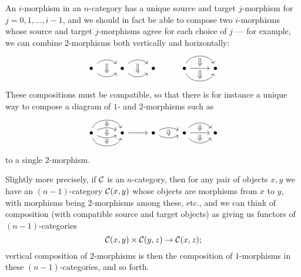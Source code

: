 \documentclass[a4paper,11pt]{article}
\begin{document}
An $i$-morphism in an $n$-category has a unique source and target
$j$-morphism for $j = 0,1,\dots,i-1$, and we should in fact be able to
compose two $i$-morphisms whose source and target $j$-morphisms agree
for each choice of $j$ --- for example, we can combine $2$-morphisms both
vertically and horizontally:
  \[
    \begin{tikzcd}
      \bullet \ar[r, bend left=40, ""{below,name=A,inner sep=2pt}]
      \ar[r, bend right=40, ""{above,name=B,inner sep=2pt}] & \bullet
      \ar[r, bend left=40, ""{below,name=C,inner sep=2pt}]
      \ar[r, bend right=40, ""{above,name=D,inner sep=2pt}] & \bullet
      \ar[from=A, to=B, Rightarrow]
      \ar[from=C, to=D, Rightarrow]
      &  \bullet \ar[r, bend left=70, ""{below,name=E,inner sep=1pt}]
      \arrow[r, ""{above,name=F,inner sep=1pt}, ""{below,name=G,inner
        sep=1pt}]
      \ar[r, bend right=70, ""{above,name=H,inner sep=1pt}]
      & \bullet
      \ar[from=E, to=F, Rightarrow]
      \ar[from=G, to=H, Rightarrow]      
    \end{tikzcd}
  \]
These compositions must be compatible, so that there is for instance a
unique way to compose a diagram of $1$- and $2$-morphisms such as
\[
\begin{tikzcd}
  \bullet 
  \ar[r, bend left=75, ""{below,name=A,inner sep=0.5pt}] 
  \ar[r, bend left=25, ""{name=B1,inner sep=0.5pt},
  ""{name=B2,below,inner sep=1pt}] 
  \ar[r, bend right=25, ""{name=C1,inner sep=1pt}, ""{below,name=C2,inner sep=0.5pt}] 
  \ar[r, bend right=75, ""{name=D,inner sep=1pt}] &
  \bullet 
  \ar[r]  &
  \bullet 
  \ar[r, bend left=25, ""{below,name=E,inner sep=1pt}] 
  \ar[r, bend right=25, ""{name=F,inner sep=1pt}] &
  \bullet 
  \ar[r, bend left=50, ""{below,name=G,inner sep=1pt}] 
  \ar[r, ""{name=H1,inner sep=1pt}, ""{name=H2,below,inner sep=1pt}] 
  \ar[r, bend right=50, ""{name=I,inner sep=1pt}] &
  \bullet
  \arrow[from=A,to=B1,Rightarrow]
  \arrow[from=B2,to=C1,Rightarrow]
  \arrow[from=C2,to=D,Rightarrow]
  \arrow[from=E,to=F,Rightarrow]
  \arrow[from=G,to=H1,Rightarrow]
  \arrow[from=H2,to=I,Rightarrow]
\end{tikzcd}
\]  
to a single $2$-morphism.

Slightly more precisely, if $\mathcal{C}$ is an $n$-category, then for any pair of objects $x,y$ we
have an $(n-1)$-category $\mathcal{C}(x,y)$ whose objects are morphisms from
$x$ to $y$, with morphisms being $2$-morphisms among these, etc., and we
can think of composition (with compatible source and target objects) as giving us functors of $(n-1)$-categories
\[ \eC(x,y) \times \eC(y,z)\to \eC(x,z);\] vertical composition of $2$-morphisms is then the composition of
$1$-morphisms in these $(n-1)$-categories, and so forth.
\end{document}

